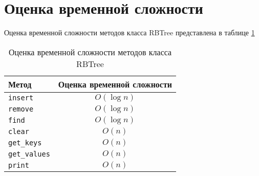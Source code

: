 \section{Оценка временной сложности}

Оценка временной сложности методов класса RBTree представлена в таблице \ref{tab:complexity}

\begin{table}[H]
    \centering
    \caption{Оценка временной сложности методов класса RBTree}
    \label{tab:complexity}
    \begin{tabular}{|l|c|}
        \hline
        Метод & Оценка временной сложности \\
        \hline
        \verb|insert| & $ O(\log{n}) $ \\
        \hline
        \verb|remove| & $ O(\log{n}) $ \\
        \hline
        \verb|find| & $ O(\log{n}) $ \\
        \hline
        \verb|clear| & $ O(n) $ \\
        \hline
        \verb|get_keys| & $ O(n) $ \\
        \hline
        \verb|get_values| & $ O(n) $ \\
        \hline
        \verb|print| & $ O(n) $ \\
        \hline
    \end{tabular}
\end{table}